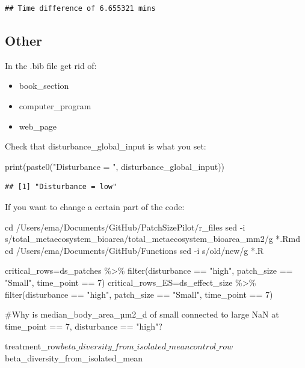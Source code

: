 \documentclass[
]{article}
\newenvironment{Shaded}{\begin{snugshade}}{\end{snugshade}}
\newcommand{\FunctionTok}[1]{\textcolor[rgb]{0.00,0.00,0.00}{#1}}
\newcommand{\NormalTok}[1]{#1}
\newcommand{\StringTok}[1]{\textcolor[rgb]{0.31,0.60,0.02}{#1}}
\begin{document}
\begin{verbatim}
## Time difference of 6.655321 mins
\end{verbatim}

\hypertarget{other}{%
\subsection{Other}\label{other}}

In the .bib file get rid of:

\begin{itemize}
\item
  book\_section
\item
  computer\_program
\item
  web\_page
\end{itemize}

Check that disturbance\_global\_input is what you set:

\begin{Shaded}
\begin{Highlighting}[]
\FunctionTok{print}\NormalTok{(}\FunctionTok{paste0}\NormalTok{(}\StringTok{"Disturbance = "}\NormalTok{, disturbance\_global\_input))}
\end{Highlighting}
\end{Shaded}

\begin{verbatim}
## [1] "Disturbance = low"
\end{verbatim}

If you want to change a certain part of the code:

\begin{Shaded}
\begin{Highlighting}[]
\NormalTok{cd /Users/ema/Documents/GitHub/PatchSizePilot/r\_files}
\NormalTok{sed {-}i \textquotesingle{}\textquotesingle{} \textquotesingle{}s/total\_metaecosystem\_bioarea/total\_metaecosystem\_bioarea\_mm2/g\textquotesingle{} *.Rmd}
\NormalTok{cd /Users/ema/Documents/GitHub/Functions }
\NormalTok{sed {-}i \textquotesingle{}\textquotesingle{} \textquotesingle{}s/old/new/g\textquotesingle{} *.R}

\NormalTok{critical\_rows=ds\_patches \%\textgreater{}\% filter(disturbance == "high", patch\_size == "Small", time\_point == 7)}
\NormalTok{critical\_rows\_ES=ds\_effect\_size \%\textgreater{}\% filter(disturbance == "high", patch\_size == "Small", time\_point == 7)}

\NormalTok{\#Why is median\_body\_area\_µm2\_d of small connected to large NaN at time\_point == 7, disturbance == "high"?}

\NormalTok{treatment\_row$beta\_diversity\_from\_isolated\_mean}
\NormalTok{control\_row$beta\_diversity\_from\_isolated\_mean}
\end{Highlighting}
\end{Shaded}
\end{document}
